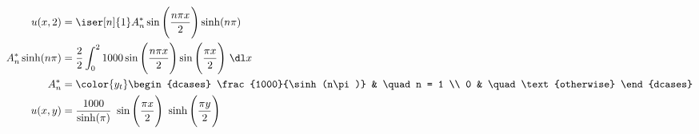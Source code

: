 \begin{enumerate}
          \begin{align}
              u(x, 2)           & = \iser[n]{1} A_n^* \sin\Bigg(
              \frac{n\pi x}{2} \Bigg)
              \sinh(n\pi)                                                            \\
              A_n^* \sinh(n\pi) & = \frac{2}{2} \int_{0}^{2} 1000 \sin\Bigg(
              \frac{n\pi x}{2}\Bigg) \sin \Bigg( \frac{\pi x}{2} \Bigg)\ \dl x       \\
              A_n^*             & = \color{y_t}
              \begin{dcases}
                  \frac{1000}{\sinh(n\pi)} & \quad n = 1            \\
                  0                        & \quad \text{otherwise}
              \end{dcases}                      \\
              u(x, y)           & = \frac{1000}{\sinh(\pi)}\ \sin\Bigg( \frac{\pi x}
              {2}\Bigg)\ \sinh\Bigg( \frac{\pi y}{2} \Bigg)
          \end{align}


\end{enumerate}
